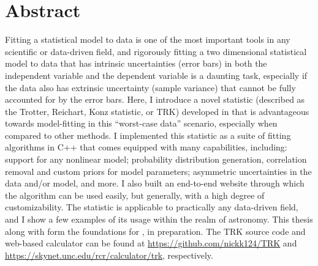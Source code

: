 

\chapter*{Abstract}
\label{cha:section_abstract}
Fitting a statistical model to data is one of the most important tools in any scientific or data-driven field, and rigorously fitting a two dimensional statistical model to data that has intrinsic uncertainties (error bars) in both the independent variable and the dependent variable is a daunting task, especially if the data also has extrinsic uncertainty (sample variance) that cannot be fully accounted for by the error bars. Here, I introduce a novel statistic (described as the Trotter, Reichart, Konz statistic, or TRK) developed in \textcite{trotter} that is advantageous towards model-fitting in this ``worst-case data'' scenario, especially when compared to other methods. I implemented this statistic as a suite of fitting algorithms in C++ that comes equipped with many capabilities, including: support for any nonlinear model; probability distribution generation, correlation removal and custom priors for model parameters; asymmetric uncertainties in the data and/or model, and more. I also built an end-to-end website through which the algorithm can be used easily, but generally, with a high degree of customizability. The statistic is applicable to practically any data-driven field, and I show a few examples of its usage within the realm of astronomy. This thesis along with \textcite{trotter} form the foundations for \textcite{TRKIapjs}, in preparation. The TRK source code and web-based calculator can be found at \url{https://github.com/nickk124/TRK} and \url{https://skynet.unc.edu/rcr/calculator/trk}, respectively.

